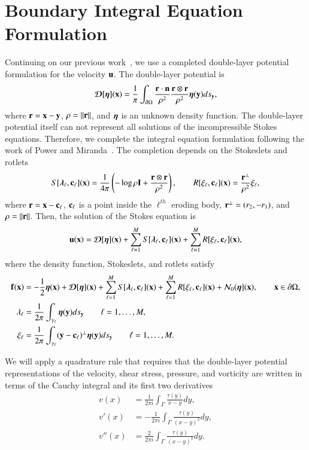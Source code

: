 \documentclass[preprint, 10pt]{elsarticle}
\begin{document}
\section{Boundary Integral Equation Formulation}
\label{s:formulation}
Continuing on our previous work~\cite{qua-moo2018}, we use a completed
double-layer potential formulation for the velocity ${\mathbf{u}}$.  The
double-layer potential is
\begin{align}
  {\boldsymbol{\mathcal D}}[{\boldsymbol\eta}]({\mathbf{x}}) = \frac{1}{\pi}\int_{{\partial}\Omega} 
    \frac{{\mathbf{r}} \cdot {\mathbf{n}}}{\rho^2} \frac{{\mathbf{r}} \otimes {\mathbf{r}}}{\rho^2}
    {\boldsymbol\eta}({\mathbf{y}}) ds_{\mathbf{y}},
\end{align}
where ${\mathbf{r}} = {\mathbf{x}} - {\mathbf{y}}$, $\rho = \|{\mathbf{r}}\|$, and ${\boldsymbol\eta}$ is an unknown
density function.  The double-layer potential itself can not represent
all solutions of the incompressible Stokes equations.  Therefore, we
complete the integral equation formulation following the work of Power
and Miranda~\cite{pow-mir1987}.  The completion depends on the
Stokeslets and rotlets
\begin{align}
  S[{\boldsymbol\lambda}_\ell,{\mathbf{c}}_\ell]({\mathbf{x}}) = \frac{1}{4\pi} \left( 
    -\log \rho {\mathbf{I}} + \frac{{\mathbf{r}} \otimes {\mathbf{r}}}{\rho^2} \right), \qquad
  R[\xi_\ell,{\mathbf{c}}_\ell]({\mathbf{x}}) = \frac{{\mathbf{r}}^\perp}{\rho^2} \xi_\ell,
\end{align}
where ${\mathbf{r}} = {\mathbf{x}} - {\mathbf{c}}_\ell$, ${\mathbf{c}}_\ell$ is a point inside the
$\ell^{th}$ eroding body, ${\mathbf{r}}^\perp = (r_2,-r_1)$, and $\rho =
\|{\mathbf{r}}\|$.  Then, the solution of the Stokes equation is
\begin{align}
  {\mathbf{u}}({\mathbf{x}}) = {\boldsymbol{\mathcal D}}[{\boldsymbol\eta}]({\mathbf{x}}) + 
    \sum_{\ell=1}^M S[{\boldsymbol\lambda}_\ell,{\mathbf{c}}_\ell]({\mathbf{x}}) + 
    \sum_{\ell=1}^M R[\xi_\ell,{\mathbf{c}}_\ell]({\mathbf{x}}),
\end{align}
where the density function, Stokeslets, and rotlets satisfy
\begin{align}
  {\mathbf{f}}({\mathbf{x}}) &= -\frac{1}{2}{\boldsymbol\eta}({\mathbf{x}}) + {\boldsymbol{\mathcal D}}[{\boldsymbol\eta}]({\mathbf{x}}) + 
    \sum_{\ell=1}^M S[{\boldsymbol\lambda}_\ell,{\mathbf{c}}_\ell]({\mathbf{x}}) + 
    \sum_{\ell=1}^M R[\xi_\ell,{\mathbf{c}}_\ell]({\mathbf{x}}) +
    {\mathcal{N}}_0({\boldsymbol\eta}]({\mathbf{x}}), \qquad {\mathbf{x}} \in {\partial}\Omega, \\
  \lambda_\ell &= \frac{1}{2\pi} \int_{\gamma_\ell} 
    {\boldsymbol\eta}({\mathbf{y}}) ds_{\mathbf{y}} \qquad \ell = 1,\ldots,M, \\
  \xi_\ell &= \frac{1}{2\pi} \int_{\gamma_\ell}
    ({\mathbf{y}} - {\mathbf{c}}_\ell)^\perp  {\boldsymbol\eta}({\mathbf{y}}) ds_{\mathbf{y}} 
    \qquad \ell = 1,\ldots,M.
\end{align}

We will apply a quadrature rule that requires that the double-layer
potential representations of the velocity, shear stress, pressure, and
vorticity are written in terms of the Cauchy integral and its first two
derivatives
\begin{align}
  \label{eqn:Cauchy}
  v(x) &= \frac{1}{2\pi i} \int_\Gamma 
    \frac{\tau(y)}{x - y} dy, \\
  v'(x) &= -\frac{1}{2\pi i} \int_\Gamma 
    \frac{\tau(y)}{(x - y)^2} dy, \\
  v''(x) &= \frac{2}{2\pi i} \int_\Gamma 
    \frac{\tau(y)}{(x - y)^3} dy.
\end{align}
\end{document}
